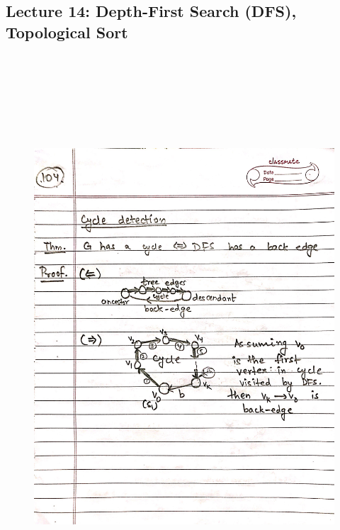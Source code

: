 \newpage
{\color{black} \subsection*{Lecture 14: Depth-First Search (DFS), Topological Sort}}
\begin{figure}[H]
    \centering
    \includegraphics[width=16cm, height=21cm]{"./MIT-6.006/MIT-6006-104"}
\end{figure}

